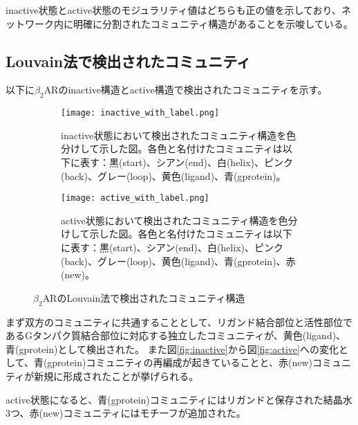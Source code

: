 inactive状態とactive状態のモジュラリティ値はどちらも正の値を示しており、ネットワーク内に明確に分割されたコミュニティ構造があることを示唆している。

\subsection{Louvain法で検出されたコミュニティ}

以下に$\beta_2$ARのinactive構造とactive構造で検出されたコミュニティを示す。

\begin{figure}[htbp]
    \centering
    \begin{subfigure}{0.48\textwidth} %
      \centering
      \texttt{[image: inactive\_with\_label.png]}
      \caption{inactive状態において検出されたコミュニティ構造を色分けして示した図。各色と名付けたコミュニティは以下に表す：黒(start)、シアン(end)、白(helix)、ピンク(back)、グレー(loop)、黄色(ligand)、青(gprotein)。}
      \label{fig:inactive_community}
    \end{subfigure}
    \hspace{0.02\textwidth} %
    \begin{subfigure}{0.48\textwidth}
      \centering
      \texttt{[image: active\_with\_label.png]}
      \caption{active状態において検出されたコミュニティ構造を色分けして示した図。各色と名付けたコミュニティは以下に表す：黒(start)、シアン(end)、白(helix)、ピンク(back)、グレー(loop)、黄色(ligand)、青(gprotein)、赤(new)。}
      \label{fig:active_community}
    \end{subfigure}
    \caption{$\beta_2$ARのLouvain法で検出されたコミュニティ構造}
    \label{fig:community-all}
  \end{figure}

\newpage

まず双方のコミュニティに共通することとして、リガンド結合部位と活性部位であるGタンパク質結合部位に対応する独立したコミュニティが、黄色(ligand)、青(gprotein)として検出された。
また図\ref{fig:inactive}から図\ref{fig:active}への変化として、青(gprotein)コミュニティの再編成が起きていることと、赤(new)コミュニティが新規に形成されたことが挙げられる。



active状態になると、青(gprotein)コミュニティにはリガンドと保存された結晶水3つ、赤(new)コミュニティにはモチーフが追加された。

